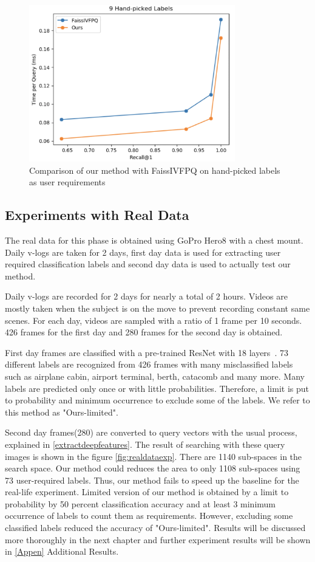 \begin{figure}
    \centering
    \includegraphics[width=0.8\textwidth]{thesis/images/9_handpicked.png}
    \caption{Comparison of our method with FaissIVFPQ on hand-picked labels as user requirements}
    \label{fig:handpickedexp}
\end{figure}

\subsection*{Experiments with Real Data}

The real data for this phase is obtained using GoPro Hero8 with a chest mount. 
Daily v-logs are taken for 2 days, first day data is used for extracting user required classification labels and second day data is used to actually test our method.

Daily v-logs are recorded for 2 days for nearly a total of 2 hours. 
Videos are mostly taken when the subject is on the move to prevent recording constant same scenes.
For each day, videos are sampled with a ratio of 1 frame per 10 seconds. 
426 frames for the first day and 280 frames for the second day is obtained.

First day frames are classified with a pre-trained ResNet with 18 layers~\cite{resnet}. 
73 different labels are recognized from 426 frames with many misclassified labels such as airplane cabin, airport terminal, berth, catacomb and many more. 
Many labels are predicted only once or with little probabilities. Therefore, a limit is put to probability and minimum occurrence to exclude some of the labels. 
We refer to this method as "Ours-limited".

Second day frames(280) are converted to query vectors with the usual process, explained in \ref{extractdeepfeatures}. The result of searching with these query images is shown in the figure \ref{fig:realdataexp}. 
There are 1140 sub-spaces in the search space. Our method could reduces the area to only 1108 sub-spaces using 73 user-required labels. 
Thus, our method fails to speed up the baseline for the real-life experiment. 
Limited version of our method is obtained by a limit to probability by 50 percent classification accuracy and at least 3 minimum occurrence of labels to count them as requirements.
However, excluding some classified labels reduced the accuracy of "Ours-limited".
Results will be discussed more thoroughly in the next chapter and further experiment results will be shown in \ref{Appen} Additional Results.

